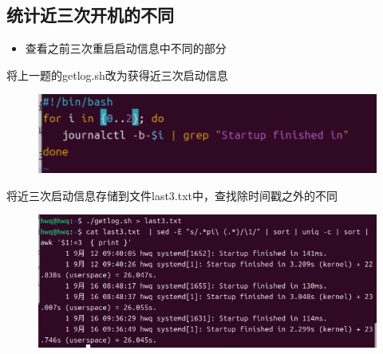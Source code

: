 \documentclass[a4paper, 12pt]{article}
\begin{document}
\subsection{统计近三次开机的不同}
\begin{itemize}
    \item 查看之前三次重启启动信息中不同的部分
\end{itemize}
将上一题的getlog.sh改为获得近三次启动信息
\begin{figure}[H]
    \centering
    \includegraphics[width=1\linewidth]{data4.png}
\end{figure}
将近三次启动信息存储到文件last3.txt中，查找除时间戳之外的不同
\begin{figure}[H]
    \centering
    \includegraphics[width=1\linewidth]{data5.png}
\end{figure}
\end{document}
